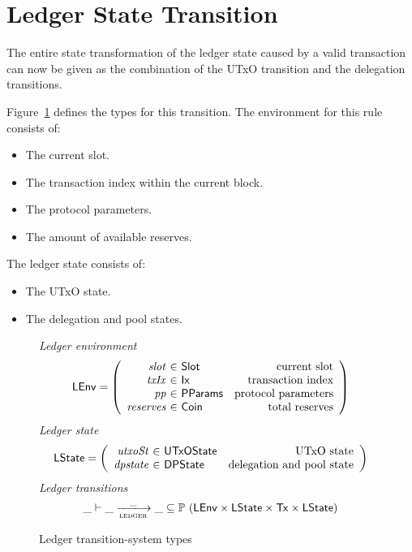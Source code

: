 \section{Ledger State Transition}
\label{sec:ledger-trans}

The entire state transformation of the ledger state caused by a valid transaction
can now be given as the combination of the UTxO transition and the delegation transitions.

Figure~\ref{fig:ts-types:ledger} defines the types for this transition.
The environment for this rule consists of:
\begin{itemize}
  \item The current slot.
  \item The transaction index within the current block.
  \item The protocol parameters.
  \item The amount of available reserves.
\end{itemize}
The ledger state consists of:
\begin{itemize}
  \item The UTxO state.
  \item The delegation and pool states.
\end{itemize}

\begin{figure}[htb]
  \emph{Ledger environment}
  \begin{equation*}
    \LEnv =
    \left(
      \begin{array}{r@{~\in~}lr}
        \var{slot} & \Slot & \text{current slot}\\
        \var{txIx} & \Ix & \text{transaction index}\\
        \var{pp} & \PParams & \text{protocol parameters}\\
        \var{reserves} & \Coin & \text{total reserves}
      \end{array}
    \right)
  \end{equation*}
  \emph{Ledger state}
  \begin{equation*}
    \LState =
    \left(
      \begin{array}{r@{~\in~}lr}
        \var{utxoSt} & \UTxOState & \text{UTxO state}\\
        \var{dpstate} & \DPState & \text{delegation and pool state}\\
      \end{array}
    \right)
  \end{equation*}
  \emph{Ledger transitions}
  \begin{equation*}
    \_ \vdash
    \var{\_} \trans{ledger}{\_} \var{\_}
    \subseteq \powerset (\LEnv \times \LState \times \Tx \times \LState)
  \end{equation*}
  \caption{Ledger transition-system types}
  \label{fig:ts-types:ledger}
\end{figure}

